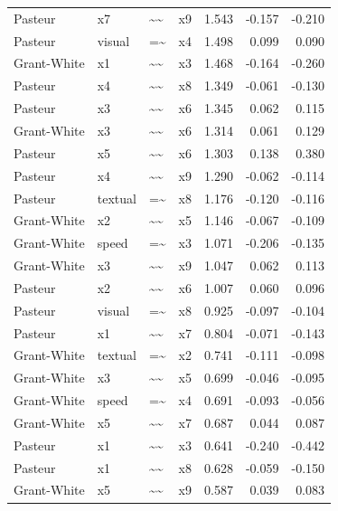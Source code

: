 \documentclass[11pt]{article}
\begin{document}
\begin{longtable}{llllrrr}
Pasteur & x7 & \textasciitilde{}\textasciitilde{} & x9 & 1.543 & -0.157 & -0.210 \\
Pasteur & visual & =\textasciitilde{} & x4 & 1.498 & 0.099 & 0.090 \\
Grant-White & x1 & \textasciitilde{}\textasciitilde{} & x3 & 1.468 & -0.164 & -0.260 \\
Pasteur & x4 & \textasciitilde{}\textasciitilde{} & x8 & 1.349 & -0.061 & -0.130 \\
Pasteur & x3 & \textasciitilde{}\textasciitilde{} & x6 & 1.345 & 0.062 & 0.115 \\
Grant-White & x3 & \textasciitilde{}\textasciitilde{} & x6 & 1.314 & 0.061 & 0.129 \\
Pasteur & x5 & \textasciitilde{}\textasciitilde{} & x6 & 1.303 & 0.138 & 0.380 \\
Pasteur & x4 & \textasciitilde{}\textasciitilde{} & x9 & 1.290 & -0.062 & -0.114 \\
Pasteur & textual & =\textasciitilde{} & x8 & 1.176 & -0.120 & -0.116 \\
Grant-White & x2 & \textasciitilde{}\textasciitilde{} & x5 & 1.146 & -0.067 & -0.109 \\
Grant-White & speed & =\textasciitilde{} & x3 & 1.071 & -0.206 & -0.135 \\
Grant-White & x3 & \textasciitilde{}\textasciitilde{} & x9 & 1.047 & 0.062 & 0.113 \\
Pasteur & x2 & \textasciitilde{}\textasciitilde{} & x6 & 1.007 & 0.060 & 0.096 \\
Pasteur & visual & =\textasciitilde{} & x8 & 0.925 & -0.097 & -0.104 \\
Pasteur & x1 & \textasciitilde{}\textasciitilde{} & x7 & 0.804 & -0.071 & -0.143 \\
Grant-White & textual & =\textasciitilde{} & x2 & 0.741 & -0.111 & -0.098 \\
Grant-White & x3 & \textasciitilde{}\textasciitilde{} & x5 & 0.699 & -0.046 & -0.095 \\
Grant-White & speed & =\textasciitilde{} & x4 & 0.691 & -0.093 & -0.056 \\
Grant-White & x5 & \textasciitilde{}\textasciitilde{} & x7 & 0.687 & 0.044 & 0.087 \\
Pasteur & x1 & \textasciitilde{}\textasciitilde{} & x3 & 0.641 & -0.240 & -0.442 \\
Pasteur & x1 & \textasciitilde{}\textasciitilde{} & x8 & 0.628 & -0.059 & -0.150 \\
Grant-White & x5 & \textasciitilde{}\textasciitilde{} & x9 & 0.587 & 0.039 & 0.083 \\

\end{longtable}
\end{document}
